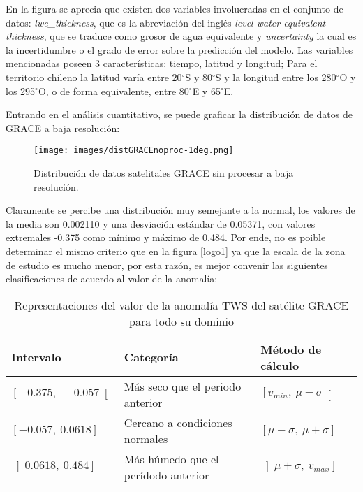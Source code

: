     En la figura se aprecia que existen dos variables involucradas en el conjunto de datos: \textit{lwe\_thickness}, que es la abreviación del inglés
    \textit{level water equivalent thickness}, que se traduce como grosor de agua equivalente y \textit{uncertainty} la cual es la incertidumbre
    o el grado de error sobre la predicción del modelo. Las variables mencionadas poseen 3 características: tiempo, latitud y longitud; Para el territorio 
    chileno la latitud varía entre 20$^{\circ}$S y 80$^{\circ}$S y la longitud entre los 280$^{\circ}$O y los 295$^{\circ}$O, o de forma equivalente, entre 
    80$^{\circ}$E y 65$^{\circ}$E.

    Entrando en el análisis cuantitativo, se puede graficar la distribución de datos de GRACE a baja resolución:
    \begin{figure}[h]
        \centering
              \texttt{[image: images/distGRACEnoproc-1deg.png]}
        \caption[Distribución de datos satelitales a baja resolución]{\footnotesize Distribución de datos satelitales GRACE sin procesar a baja resolución.}
    \end{figure}
    
    Claramente se percibe una distribución muy semejante a la normal, los valores de la media son 0.002110 y una desviación estándar de 0.05371, con valores extremales -0.375 como mínimo y 
    máximo de 0.484. Por ende, no es poible determinar el mismo criterio que en la figura \ref{logo1} ya que la escala de la zona de estudio es mucho menor, por esta razón, es mejor convenir las siguientes clasificaciones
    de acuerdo al valor de la anomalía:

    \begin{table}[H] 
        \caption[Rangos de valores de la anomalía TWS en Chile]{Representaciones del valor de la anomalía TWS del satélite GRACE para todo su dominio}
        \begin{tabularx}{0.9\textwidth}{CCC}
        \toprule
        \textbf{Intervalo}	& \textbf{Categoría}	&\textbf{Método de cálculo}\\
            \midrule
            \textbf{$\left[-0\text{.}375,~-0\text{.}057\right[$}    & Más seco que el periodo anterior       & $\left[v_{min},~ \mu - \sigma\right[$\\
            \textbf{$[-0\text{.}057,~0\text{.}0618]$}	            & Cercano a condiciones normales         & $[\mu - \sigma,~ \mu +\sigma]$ \\
            \textbf{$\left]0\text{.}0618,~0\text{.}484\right] $}    & Más húmedo que el perídodo anterior    & $\left]\mu +\sigma,~v_{max}\right]$\\
            \bottomrule
        \end{tabularx}
    \end{table}
    
